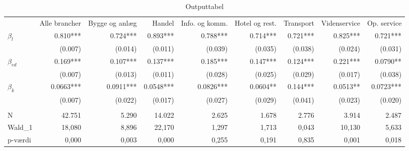 \begin{table}[tb]
\centering
\caption{Outputtabel}
\label{tbl:OutputTabel01}
\begin{tabular}{@{}lrrrrrrrr@{}}
\arrayrulecolor{MidnightBlue}\toprule
		                                              & Alle brancher & Bygge og anlæg & Handel    & Info. og komm. & Hotel og rest. & Transport & Videnservice & Op. service \\
\arrayrulecolor{MidnightBlue}\midrule
$\beta_l$                                                & 0.810***      & 0.724***       & 0.893***  & 0.788***       & 0.714***       & 0.721***  & 0.825***     & 0.721***    \\
                                                       & (0.007)       & (0.014)        & (0.011)   & (0.039)        & (0.035)        & (0.038)   & (0.024)      & (0.031)     \\
$\beta_{ed}$                                                  & 0.169***      & 0.107***       & 0.137***  & 0.185***       & 0.147***       & 0.124***  & 0.221***     & 0.0790**    \\
                                                       & (0.007)       & (0.013)        & (0.011)   & (0.028)        & (0.025)        & (0.029)   & (0.017)      & (0.038)     \\
$\beta_k$                                                 & 0.0663***     & 0.0911***      & 0.0548*** & 0.0826***      & 0.0604**       & 0.144***  & 0.0513**     & 0.0723***   \\
                                                       & (0.007)       & (0.022)        & (0.017)   & (0.027)        & (0.029)        & (0.041)   & (0.023)      & (0.020)     \\
                                                       &               &                &           &                &                &           &              &             \\
N                                                      & 42.751        & 5.290          & 14.022    & 2.625          & 1.678          & 2.776     & 3.914        & 2.487       \\
Wald\_1                                                & 18,080        & 8,896          & 22,170    & 1,297          & 1,713          & 0,043     & 10,130       & 5,633       \\
p-værdi                                                & 0,000         & 0,003          & 0,000     & 0,255          & 0,191          & 0,835     & 0,001        & 0,018       \\

\end{tabular}
\end{table}
